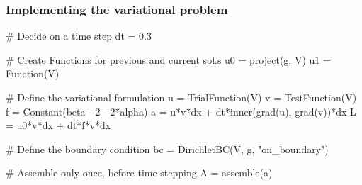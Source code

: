 \begin{frame}[fragile]
  \frametitle{Implementing the variational problem}

\begin{python}
# Decide on a time step
dt = 0.3

# Create Functions for previous and current sol.s
u0 = project(g, V)
u1 = Function(V)

# Define the variational formulation
u = TrialFunction(V)
v = TestFunction(V)
f = Constant(beta - 2 - 2*alpha)
a = u*v*dx + dt*inner(grad(u), grad(v))*dx
L = u0*v*dx + dt*f*v*dx

# Define the boundary condition
bc = DirichletBC(V, g, "on_boundary")

# Assemble only once, before time-stepping
A = assemble(a)
\end{python}

\end{frame}
